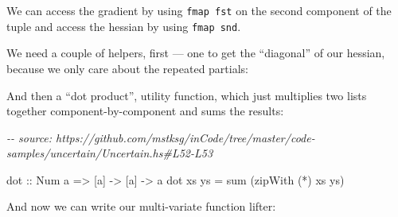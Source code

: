 \documentclass[]{article}
\newenvironment{Shaded}{}{}
\newcommand{\CommentTok}[1]{\textcolor[rgb]{0.38,0.63,0.69}{\textit{#1}}}
\newcommand{\DataTypeTok}[1]{\textcolor[rgb]{0.56,0.13,0.00}{#1}}
\newcommand{\DecValTok}[1]{\textcolor[rgb]{0.25,0.63,0.44}{#1}}
\newcommand{\FunctionTok}[1]{\textcolor[rgb]{0.02,0.16,0.49}{#1}}
\newcommand{\KeywordTok}[1]{\textcolor[rgb]{0.00,0.44,0.13}{\textbf{#1}}}
\newcommand{\NormalTok}[1]{#1}
\newcommand{\OperatorTok}[1]{\textcolor[rgb]{0.40,0.40,0.40}{#1}}
\newcommand{\OtherTok}[1]{\textcolor[rgb]{0.00,0.44,0.13}{#1}}
\begin{document}
We can access the gradient by using \texttt{fmap\ fst} on the second component
of the tuple and access the hessian by using \texttt{fmap\ snd}.

We need a couple of helpers, first --- one to get the ``diagonal'' of our
hessian, because we only care about the repeated partials:

\begin{Shaded}
\end{Shaded}

And then a ``dot product'', utility function, which just multiplies two lists
together component-by-component and sums the results:

\begin{Shaded}
\begin{Highlighting}[]
\CommentTok{{-}{-} source: https://github.com/mstksg/inCode/tree/master/code{-}samples/uncertain/Uncertain.hs\#L52{-}L53}

\OtherTok{dot ::} \DataTypeTok{Num}\NormalTok{ a }\OtherTok{=\textgreater{}}\NormalTok{ [a] }\OtherTok{{-}\textgreater{}}\NormalTok{ [a] }\OtherTok{{-}\textgreater{}}\NormalTok{ a}
\NormalTok{dot xs ys }\OtherTok{=} \FunctionTok{sum}\NormalTok{ (}\FunctionTok{zipWith}\NormalTok{ (}\OperatorTok{*}\NormalTok{) xs ys)}
\end{Highlighting}
\end{Shaded}

And now we can write our multi-variate function lifter:
\end{document}
